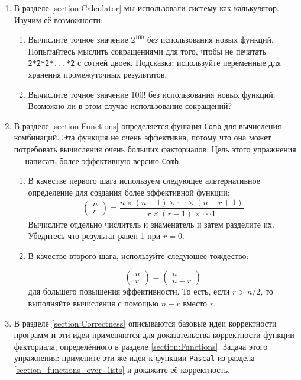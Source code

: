 \begin{enumerate}
\item{В разделе \ref{section:Calculator} мы использовали систему как калькулятор. Изучим её возможности:
  \begin{enumerate}
  \item{Вычислите точное значение $2^{100}$ \emph{без} использования новых функций. Попытайтесь мыслить сокращениями для того, чтобы не печатать \lstinline|2*2*2*...*2| с сотней двоек. Подсказка: используйте переменные для хранения промежуточных результатов.}
  \item{Вычислите точное значение $100!$ без использования новых функций. Возможно ли в этом случае использование сокращений?}
  \end{enumerate}
}

\item{В разделе \ref{section:Functions} определяется функция \lstinline|Comb| для вычисления комбинаций. Эта функция не очень эффективна, потому что она может потребовать вычисления очень больших факториалов. Цель этого упражнения --- написать более эффективную версию \lstinline|Comb|.

  \begin{enumerate}

  \item{В качестве первого шага используем следующее альтернативное определение для создания более эффективной функции:
    $$
    \begin{pmatrix}
      n \\
      r
    \end{pmatrix}
    =
    \frac{n \times (n - 1) \times \cdot \cdot \cdot \times (n - r +1)}{r \times (r - 1) \times \cdot \cdot \cdot 1}
    $$
    Вычислите отдельно числитель и знаменатель и затем разделите их. Убедитесь что результат равен 1 при $r = 0$.
  }

  \item{В качестве второго шага, используйте следующее тождество:
    
    $$
    \begin{pmatrix}
      n \\
      r
    \end{pmatrix}
    =
    \begin{pmatrix}
      n \\
      n - r
    \end{pmatrix}
    $$
для большего повышения эффективности. То есть, если $r > n/2$, то выполняйте вычисления с помощью $n - r$ вместо $r$.
  }
  \end{enumerate}

}

  \item{В разделе \ref{section:Correctness} описываются базовые идеи корректности программ и эти идеи применяются для доказательства корректности функции факториала, определённого в разделе \ref{section:Functions}. Задача этого упражнения: примените эти же идеи к функции \lstinline|Pascal| из раздела \ref{section_functions_over_lists} и докажите её корректность.}
\end{enumerate}



